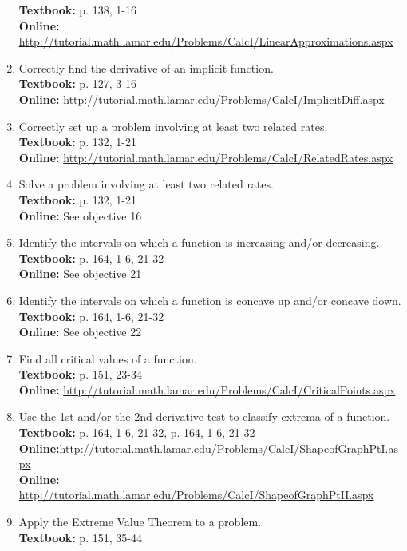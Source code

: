 \documentclass[12pt,landscape]{article}
\begin{document}
\begin{multicols}{2}
\begin{enumerate}
\textbf{Textbook:} p. 138, 1-16\\
\textbf{Online:} \url{http://tutorial.math.lamar.edu/Problems/CalcI/LinearApproximations.aspx}
\item Correctly find the derivative of an implicit function.\\
\textbf{Textbook:} p. 127, 3-16 \\
\textbf{Online:} \url{http://tutorial.math.lamar.edu/Problems/CalcI/ImplicitDiff.aspx}
\item Correctly set up a problem involving at least two related rates.\\
\textbf{Textbook:} p. 132, 1-21\\
\textbf{Online:} \url{http://tutorial.math.lamar.edu/Problems/CalcI/RelatedRates.aspx}
\item Solve a problem involving at least two related rates.\\
\textbf{Textbook:} p. 132, 1-21\\
\textbf{Online:} See objective 16
\item Identify the intervals on which a function is increasing and/or decreasing.\\
\textbf{Textbook:} p. 164, 1-6, 21-32\\
\textbf{Online:} See objective 21
\item Identify the intervals on which a function is concave up and/or concave down.\\
\textbf{Textbook:} p. 164, 1-6, 21-32\\
\textbf{Online:} See objective 22
\item Find all critical values of a function.\\
\textbf{Textbook:} p. 151, 23-34 \\
\textbf{Online:} \url{http://tutorial.math.lamar.edu/Problems/CalcI/CriticalPoints.aspx}
\item Use the 1st and/or the 2nd derivative test to classify extrema of a function. \\
\textbf{Textbook:} p. 164, 1-6, 21-32, p. 164, 1-6, 21-32 \\
\textbf{Online:}\url{http://tutorial.math.lamar.edu/Problems/CalcI/ShapeofGraphPtI.aspx}\\
\textbf{Online:} \url{http://tutorial.math.lamar.edu/Problems/CalcI/ShapeofGraphPtII.aspx}
\item Apply the Extreme Value Theorem to a problem.\\
\textbf{Textbook:} p. 151, 35-44\\

\end{enumerate}
\end{multicols}
\end{document}
